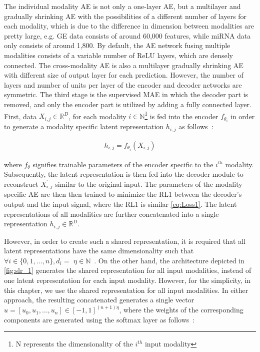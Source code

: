 \hspace*{3.5mm} The individual modality AE is not only a one-layer AE, but a multilayer and gradually shrinking AE with the possibilities of a different number of layers for each modality, which is due to the difference in dimension between modalities are pretty large, e.g. GE data consists of around 60,000 features, while miRNA data only consists of around 1,800. By default, the AE network fusing multiple modalities consists of a variable number of ReLU layers, which are densely connected. The cross-modality AE is also a multilayer gradually shrinking AE with different size of output layer for each prediction. However, the number of layers and number of units per layer of the encoder and decoder networks are symmetric. The third stage is the supervised MAE in which the decoder part is removed, and only the encoder part is utilized by adding a fully connected layer. %
First, data $X_{i,j} \in \mathbb{R}^{D}$, for each modality $i \in \mathbb{N}$\footnote{N represents the dimensionality of the $i^{th}$ input modality} is fed into the encoder $f_{\theta_{i}}$ in order to generate a modality specific latent representation $h_{i, j}$ as follows~\cite{mmdcae}: 

\vspace{-4mm}
\begin{align}
    h_{i, j}=f_{\theta_{i}}\left({X}_{i, j}\right)
\end{align}

where $f_\theta$ signifies trainable parameters of the encoder specific to the $i^{th}$ modality. Subsequently, the latent representation is then fed into the decoder module to reconstruct ${X}_{i, j}^{\prime}$ similar to the original input. The parameters of the modality specific AE are then then trained to minimize the RL1 between the decoder’s output and the input signal, where the RL1 is similar \cref{eq:Loss1}. The latent representations of all modalities are further concatenated into a single representation $h_{i,j} \in \mathbb{R}^{D}$. 

\hspace*{3.5mm} However, in order to create such a shared representation, it is required that all latent representations have the same dimensionality such that $\forall i \in\{0,1, \ldots, n\}, d_{i}=$ $\eta \in \mathbb{N}$~\cite{mmdcae}. On the other hand, the architecture depicted in \cref{fig:slr_1} generates the shared representation for all input modalities, instead of one latent representation for each input modality. However, for the simplicity, in this chapter, we use the shared representation for all input modalities. In either approach, the resulting concatenated generates a single vector $u=\left[u_{0}, u_{1}, \ldots, u_{n}\right] \in[-1,1]^{(n+1) \eta}$, where the weights of the corresponding components are generated using the softmax layer as follows~\cite{mmdcae}:


